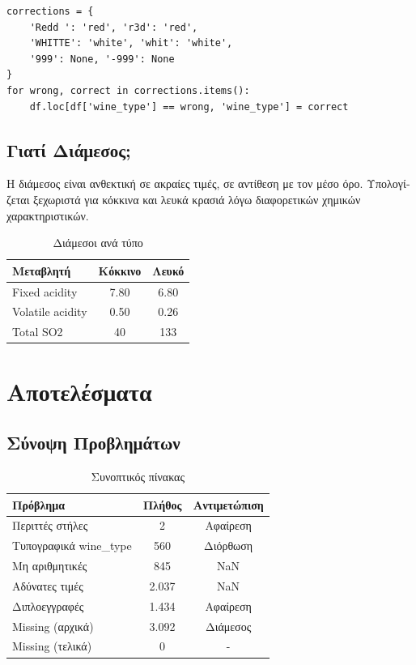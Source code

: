\documentclass[12pt,a4paper]{article}
\begin{document}
\begin{lstlisting}
corrections = {
    'Redd ': 'red', 'r3d': 'red',
    'WHITTE': 'white', 'whit': 'white',
    '999': None, '-999': None
}
for wrong, correct in corrections.items():
    df.loc[df['wine_type'] == wrong, 'wine_type'] = correct
\end{lstlisting}

\subsection{\textgreek{Γιατί Διάμεσος;}}

\begin{mdframed}[style=infobox]
\textgreek{Η διάμεσος είναι ανθεκτική σε ακραίες τιμές, σε αντίθεση με τον μέσο όρο. Υπολογίζεται ξεχωριστά για κόκκινα και λευκά κρασιά λόγω διαφορετικών χημικών χαρακτηριστικών.}
\end{mdframed}

\begin{table}[H]
\centering
\caption{\textgreek{Διάμεσοι ανά τύπο}}
\begin{tabular}{lcc}
\toprule
\textbf{\textgreek{Μεταβλητή}} & \textbf{\textgreek{Κόκκινο}} & \textbf{\textgreek{Λευκό}} \\
\midrule
Fixed acidity & 7.80 & 6.80 \\
Volatile acidity & 0.50 & 0.26 \\
Total SO2 & 40 & 133 \\
\bottomrule
\end{tabular}
\end{table}

\section{\textgreek{Αποτελέσματα}}

\subsection{\textgreek{Σύνοψη Προβλημάτων}}

\begin{table}[H]
\centering
\caption{\textgreek{Συνοπτικός πίνακας}}
\begin{tabular}{lcc}
\toprule
\textbf{\textgreek{Πρόβλημα}} & \textbf{\textgreek{Πλήθος}} & \textbf{\textgreek{Αντιμετώπιση}} \\
\midrule
\textgreek{Περιττές στήλες} & 2 & \textgreek{Αφαίρεση} \\
\textgreek{Τυπογραφικά wine\_type} & 560 & \textgreek{Διόρθωση} \\
\textgreek{Μη αριθμητικές} & 845 & NaN \\
\textgreek{Αδύνατες τιμές} & 2.037 & NaN \\
\textgreek{Διπλοεγγραφές} & 1.434 & \textgreek{Αφαίρεση} \\
Missing (\textgreek{αρχικά}) & 3.092 & \textgreek{Διάμεσος} \\
Missing (\textgreek{τελικά}) & 0 & - \\
\bottomrule
\end{tabular}
\end{table}
\end{document}

